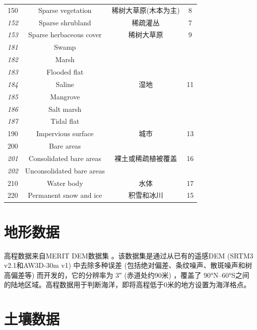\begin{table}[htbp]
\begin{tabular}{cccc}
%
    \cline{1-4} 150 & Sparse vegetation & 稀树大草原(木本为主) & 8 \\
%
    \cline{1-4} \textit{152} & Sparse shrubland & 稀疏灌丛 & 7 \\
%
    \cline{1-4} \textit{153} & Sparse herbaceous cover & 稀树大草原 & 9 \\
%
    \cline{1-4} \textit{181} & Swamp & \multirow{7}{*}{湿地} & \multirow{7}{*}{11} \\
    \textit{182} & Marsh & & \\
    \textit{183} & Flooded flat & & \\
    \textit{184} & Saline & & \\
    \textit{185} & Mangrove & & \\
    \textit{186} & Salt marsh & & \\
    \textit{187} & Tidal flat & & \\
%
    \cline{1-4} 190 & Impervious surface & 城市 & 13 \\
%
    \cline{1-4} 200 & Bare areas & \multirow{3}{*}{裸土或稀疏植被覆盖} & \multirow{3}{*}{16} \\
    \textit{201} & Consolidated bare areas & & \\
    \textit{202} & Unconsolidated bare areas & & \\
%
    \cline{1-4} 210 & Water body & 水体 & 17 \\
%
    \cline{1-4} 220 & Permanent snow and ice & 积雪和冰川 & 15 \\
%
    \bottomrule
  \end{tabular}
\end{table}




\section{地形数据}
高程数据来自MERIT DEM数据集 \citep{yamazaki2017high}。该数据集是通过从已有的遥感DEM (SRTM3 v2.1和AW3D-30m v1) 中去除多种误差 (包括绝对偏差、条纹噪声、散斑噪声和树高偏差等) 而开发的，它的分辨率为 \ang{;;3} (赤道处约90米) ，覆盖了 \ang{90;;}N--\ang{60;;}S之间的陆地区域。高程数据用于判断海洋，即将高程低于0米的地方设置为海洋格点。





\section{土壤数据}\label{土壤数据}
